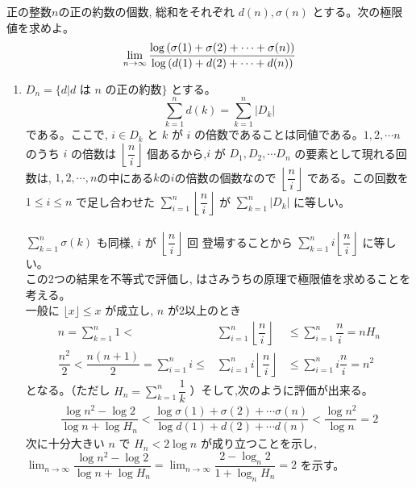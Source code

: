 正の整数$n$の正の約数の個数, 総和をそれぞれ $d(n), \sigma (n)$ とする。次の極限値を求めよ。
\[\displaystyle\lim_{n\to \infty}\dfrac{\log{(\sigma(1) +\sigma(2) +\cdots +\sigma (n))}}{\log{(d(1)+d(2)+\cdots +d(n))}}\]
\enthm
\begin{enumerate}
\item[]$D_n=\{d| \mbox{$d$ は $n$ の正の約数}\}$ とする。
\[\displaystyle\sum_{k=1}^n d(k) = \displaystyle\sum_{k=1}^n|D_k|\] である。ここで, $i\in D_k$ と $k$ が $i$ の倍数であることは同値である。$1,2,\cdots n$ のうち $i$ の倍数は $\left\lfloor\dfrac{n}{i}\right\rfloor$ 個あるから,$i$ が $D_1, D_2, \cdots D_n$ の要素として現れる回数は, $1,2,\cdots, n$の中にある$k$の$i$の倍数の個数なので $\left\lfloor\dfrac{n}{i}\right\rfloor$ である。この回数を $1\le i\le n$ で足し合わせた $\displaystyle\sum_{i=1}^n \left\lfloor\dfrac{n}{i}\right\rfloor$ が $\displaystyle\sum_{k=1}^n |D_k|$ に等しい。 \\
\\
$\displaystyle\sum_{k=1}^n \sigma (k)$ も同様, $i$ が $\left\lfloor\dfrac{n}{i}\right\rfloor$ 回 登場することから $\displaystyle\sum_{k=1}^n i\left\lfloor\dfrac{n}{i}\right\rfloor$ に等しい。 \\
この2つの結果を不等式で評価し, はさみうちの原理で極限値を求めることを考える。\\
一般に $\lfloor x\rfloor\le x$ が成立し, $n$ が2以上のとき
\begin{eqnarray*}
n=\displaystyle\sum_{k=1}^n 1 < &\displaystyle\sum_{i=1}^n \left\lfloor\dfrac{n}{i}\right\rfloor& \le\displaystyle\sum_{i=1}^n \dfrac{n}{i}=nH_n\\
\dfrac{n^2}{2}<\dfrac{n(n+1)}{2}=
\displaystyle\sum_{i=1}^n i \le &\displaystyle\sum_{i=1}^n i\left\lfloor\dfrac{n}{i}\right\rfloor & \le \displaystyle\sum_{i=1}^n i\dfrac{n}{i} =n^2
\end{eqnarray*}
となる。（ただし $H_n=\displaystyle\sum_{k=1}^n\dfrac{1}{k}$ ）そして,次のように評価が出来る。
\begin{eqnarray*}
\dfrac{\log{n^2}-\log{2}}{\log{n}+\log{H_n}} < \dfrac{\log{\sigma(1) +\sigma (2)+\cdots \sigma (n)}}{\log{d(1)+d(2)+\cdots d(n)}} < \dfrac{\log{n^2}}{\log{n}} = 2
\end{eqnarray*}
次に十分大きい $n$ で $H_n<2\log{n}$ が成り立つことを示し,\\
$\displaystyle\lim_{n\to\infty}\dfrac{\log{n^2}-\log{2}}{\log{n}+\log{H_n}}=\displaystyle\lim_{n\to\infty}\dfrac{2-\log_n{2}}{1+\log_n{H_n}}=2$ を示す。\\
\\

\end{enumerate}
